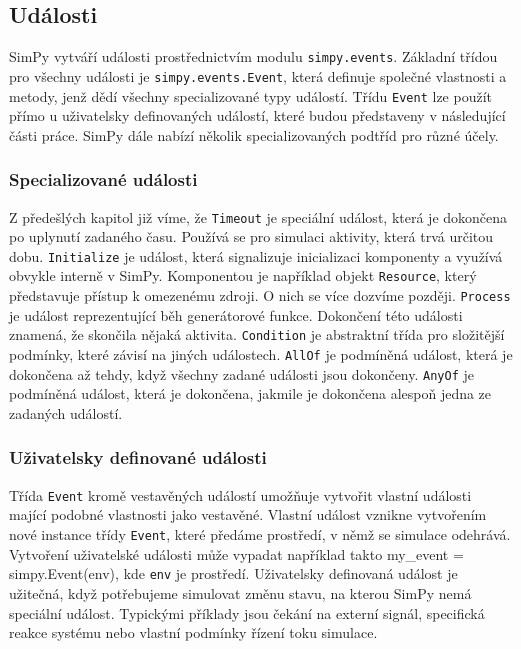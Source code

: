 \documentclass[12pt,a4paper]{article}
\begin{document}
\subsection{Události}
SimPy vytváří události prostřednictvím modulu \texttt{simpy.events}. Základní třídou pro všechny události je \texttt{simpy.events.Event}, která definuje společné vlastnosti a metody, jenž dědí všechny specializované typy událostí. Třídu \texttt{Event} lze použít přímo u uživatelsky definovaných událostí, které budou představeny v následující části práce. SimPy dále nabízí několik specializovaných podtříd pro různé účely.

\subsubsection{Specializované události}

Z předešlých kapitol již víme, že \texttt{Timeout} je speciální událost, která je dokončena po uplynutí zadaného času. Používá se pro simulaci aktivity, která trvá určitou dobu.
 \texttt{Initialize} je událost, která signalizuje inicializaci komponenty a využívá obvykle interně v SimPy. Komponentou je například objekt \texttt{Resource}, který představuje přístup k omezenému zdroji. O nich se více dozvíme později. \texttt{Process} je událost reprezentující běh generátorové funkce. Dokončení této události znamená, že skončila nějaká aktivita. \texttt{Condition} je abstraktní třída pro složitější podmínky, které závisí na jiných událostech. \texttt{AllOf} je podmíněná událost, která je dokončena až tehdy, když všechny zadané události jsou dokončeny. \texttt{AnyOf} je podmíněná událost, která je dokončena, jakmile je dokončena alespoň jedna ze zadaných událostí.

\subsubsection{Uživatelsky definované události}

Třída \texttt{Event} kromě vestavěných událostí umožňuje vytvořit vlastní události mající podobné vlastnosti jako vestavěné. Vlastní událost vznikne vytvořením nové instance třídy \texttt{Event}, které předáme prostředí, v němž se simulace odehrává. Vytvoření uživatelské události může vypadat například takto {my\_event = simpy.Event(env)}, kde \texttt{env} je prostředí. Uživatelsky definovaná událost je užitečná, když potřebujeme simulovat změnu stavu, na kterou SimPy nemá speciální událost. Typickými příklady jsou čekání na externí signál, specifická reakce systému nebo vlastní podmínky řízení toku simulace.
\end{document}
